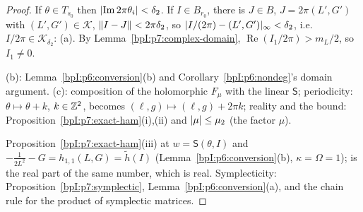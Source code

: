 \begin{proof}
\label{stepI:p7:po-dom} If $\theta\in T_{s_0}$ then $\lvert \operatorname{Im}2\pi\theta_i\rvert<\delta_2$. If $I\in B_{r_0}$, there is $J\in B$, $J=2\pi(L',G')$ with $(L',G')\in\mathcal K$, $\lVert I-J\rVert<2\pi\delta_2$, so $\lvert I/(2\pi)-(L',G')\rvert_\infty<\delta_2$, i.e.\ $I/2\pi\in\mathcal K_{\delta_2}$: (a). By Lemma~\ref{bpI:p7:complex-domain}, $\operatorname{Re}(I_1/2\pi)>m_L/2$, so $I_1\ne0$.

\label{stepI:p7:po-prop} (b): Lemma~\ref{bpI:p6:conversion}(b) and Corollary~\ref{bpI:p6:nondeg}'s domain argument. (c): composition of the holomorphic $F_\mu$ with the linear $\mathsf S$; periodicity: $\theta\mapsto\theta+k$, $k\in\mathbb{Z}^2$, becomes $(\ell,g)\mapsto(\ell,g)+2\pi k$; reality and the bound: Proposition~\ref{bpI:p7:exact-ham}(i),(ii) and $\lvert \mu\rvert\le\mu_2$ (the factor $\mu$).

\label{stepI:p7:po-exact} Proposition~\ref{bpI:p7:exact-ham}(iii) at $w=\mathsf S(\theta,I)$ and $-\frac1{2L^2}-G=h_{1,1}(L,G)=\tilde h(I)$ (Lemma~\ref{bpI:p6:conversion}(b), $\kappa=\Omega=1$);  is the real part of the same number, which is real. Symplecticity: Proposition~\ref{bpI:p7:symplectic}, Lemma~\ref{bpI:p6:conversion}(a), and the chain rule for the product of symplectic matrices.
\end{proof}

